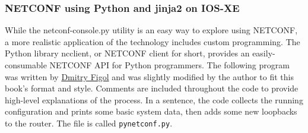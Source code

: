 \subsubsection{NETCONF using Python and jinja2 on IOS-XE}
While the netconf-console.py utility is an easy way to explore using NETCONF,
a more realistic application of the technology includes custom programming.
The Python library ncclient, or NETCONF client for short, provides an
easily-consumable NETCONF API for Python programmers. The following program
was written by \href{https://twitter.com/dmfigol}{Dmitry Figol} and was
slightly modified by the author to fit this book's format and style. Comments
are included throughout the code to provide high-level explanations of the
process. In a sentence, the code collects the running configuration and prints
some basic system data, then adds some new loopbacks to the router. The file
is called \verb|pynetconf.py|.

